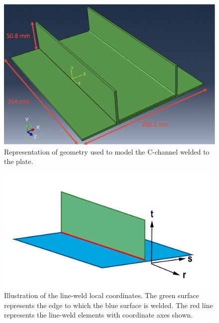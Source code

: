 \begin{figure}[h]
\centering
\includegraphics[width=\textwidth,height=\textheight,keepaspectratio]{abaqus_model.png}
\caption{Representation of geometry used to model the C-channel welded to the plate.}
\label{fig:abaqus_model}
\end{figure}

\begin{figure}[h]
\centering
\includegraphics[width=\textwidth,height=\textheight,keepaspectratio]{local_coords.png}
\caption{Illustration of the line-weld local coordinates. The green surface
represents the edge to which the blue surface is welded. The red line represents
the line-weld elements with coordinate axes shown.}
\label{fig:local_coords}
\end{figure}

